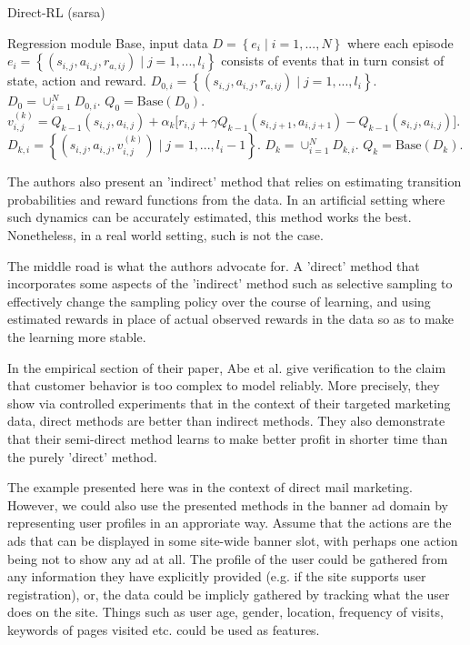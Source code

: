 \documentclass{article} %
\newcommand{\setof}[1]{\ensuremath{\left \{ #1 \right \}}}
\begin{document}
\begin{algorithm}
  \caption{Direct-RL (sarsa) \cite{abe2002empirical}}
  \label{alg:directrl}
  \begin{algorithmic}[1]
    \Require Regression module Base, input data $D = \setof{e_i \;|\;
    i=1,...,N}$ where each episode $e_i = \setof{(s_{i,j}, a_{i,j}, r_{a,ij})
    \;|\; j=1,...,l_i}$ consists of events that in turn consist of state,
    action and reward.
      \State $D_{0,i} = \setof{(s_{i,j}, a_{i,j}, r_{a,ij}) \;|\;
      j=1,...,l_i}$.
    \EndFor
    \State $D_0 = \cup_{i=1}^N D_{0,i}$.
    \State $Q_0 = \text{Base}(D_0)$.
        \State $v^{(k)}_{i,j} = Q_{k-1}(s_{i,j}, a_{i,j}) +
        \alpha_k \big[ r_{i,j} + \gamma Q_{k-1}(s_{i, j+1}, a_{i, j+1}) -
        Q_{k-1}(s_{i,j}, a_{i,j}) \big]$.
        \State $D_{k,i} = \setof{(s_{i,j}, a_{i,j}, v^{(k)}_{i,j}) \;|\;
      j=1,...,l_i-1}$.
        \EndFor
      \EndFor
      \State $D_k = \cup_{i=1}^N D_{k,i}$.
      \State $Q_k = \text{Base}(D_k)$.
    \EndFor
    \State{}
  \end{algorithmic}
\end{algorithm}

The authors also present an 'indirect' method that relies on estimating
transition probabilities and reward functions from the data. In an
artificial setting where such dynamics can be accurately estimated, this method
works the best. Nonetheless, in a real world setting, such is not the case.

The middle road is what the authors advocate for. A 'direct' method that
incorporates some aspects of the 'indirect' method such as selective sampling
to effectively change the sampling policy over the course of learning, and
using estimated rewards in place of actual observed rewards in the data so as
to make the learning more stable.


In the empirical section of their paper, Abe et al. \cite{abe2002empirical}
give verification to the claim that customer behavior is too complex to model
reliably. More precisely, they show via controlled experiments that in the
context of their targeted marketing data, direct methods are better than
indirect methods. They also demonstrate that their semi-direct method learns to
make better profit in shorter time than the purely 'direct' method.

The example presented here was in the context of direct mail marketing.
However, we could also use the presented methods in the banner ad domain by
representing user profiles in an approriate way. Assume that the actions are
the ads that can be displayed in some site-wide banner slot, with perhaps one
action being not to show any ad at all. The profile of the user could be
gathered from any information they have explicitly provided (e.g. if the site
supports user registration), or, the data could be implicly gathered by
tracking what the user does on the site. Things such as user age, gender,
location, frequency of visits, keywords of pages visited etc. could be used as
features.
\end{document}
